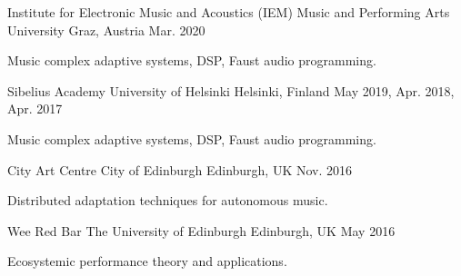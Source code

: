 

\begin{cventries}

  \cventry
    {Institute for Electronic Music and Acoustics (IEM)} %
    {Music and Performing Arts University} %
    {Graz, Austria} %
    {Mar. 2020} %
    {
      \begin{cvitems} %
        \item {Music complex adaptive systems, DSP, Faust audio programming.}
      \end{cvitems}
    }

  \cventry
    {Sibelius Academy} %
    {University of Helsinki} %
    {Helsinki, Finland} %
    {May 2019, Apr. 2018, Apr. 2017} %
    { 
      \begin{cvitems} %
        \item {Music complex adaptive systems, DSP, Faust audio programming.}
      \end{cvitems}
    }

  \cventry
    {City Art Centre} %
    {City of Edinburgh} %
    {Edinburgh, UK} %
    {Nov. 2016} %
    {
      \begin{cvitems} %
        \item {Distributed adaptation techniques for autonomous music.}
      \end{cvitems}
    }

  \cventry
    {Wee Red Bar} %
    {The University of Edinburgh} %
    {Edinburgh, UK} %
    {May 2016} %
    {
      \begin{cvitems} %
        \item {Ecosystemic performance theory and applications.}
      \end{cvitems}
    }


\end{cventries}
